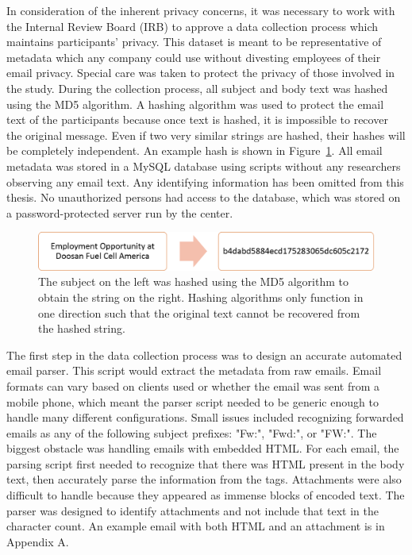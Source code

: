 \documentclass[12pt]{report}
\begin{document}
In consideration of the inherent privacy concerns, it was necessary to work with the Internal Review Board (IRB) to approve a data collection process which maintains participants' privacy.
This dataset is meant to be representative of metadata which any company could use without divesting employees of their email privacy.
Special care was taken to protect the privacy of those involved in the study.
During the collection process, all subject and body text was hashed using the MD5 algorithm.
A hashing algorithm was used to protect the email text of the participants because once text is hashed, it is impossible to recover the original message.
Even if two very similar strings are hashed, their hashes will be completely independent.
An example hash is shown in Figure~\ref{fig:hash_ex}.
All email metadata was stored in a MySQL database using scripts without any researchers observing any email text.
Any identifying information has been omitted from this thesis.
No unauthorized persons had access to the database, which was stored on a password-protected server run by the center.
\begin{figure}[t]
	\centering
	\includegraphics[width=\columnwidth,trim={0mm 0mm 0mm 0mm},clip]{hash_ex}
	\caption[Example subject hash]{The subject on the left was hashed using the MD5 algorithm to obtain the string on the right.  Hashing algorithms only function in one direction such that the original text cannot be recovered from the hashed string.}
	\label{fig:hash_ex}
\end{figure}


The first step in the data collection process was to design an accurate automated email parser.
This script would extract the metadata from raw emails.
Email formats can vary based on clients used or whether the email was sent from a mobile phone, which meant the parser script needed to be generic enough to handle many different configurations.
Small issues included recognizing forwarded emails as any of the following subject prefixes: "Fw:", "Fwd:", or "FW:".
The biggest obstacle was handling emails with embedded HTML.
For each email, the parsing script first needed to recognize that there was HTML present in the body text, then accurately parse the information from the tags.
Attachments were also difficult to handle because they appeared as immense blocks of encoded text.
The parser was designed to identify attachments and not include that text in the character count.  
An example email with both HTML and an attachment is in Appendix A.
\end{document}
